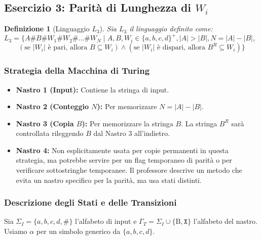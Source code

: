 \documentclass[a4paper, 11pt]{book} %
\newtheorem{definition}[theorem]{Definizione}
\theoremstyle{definition}
\newcommand{\B}{\text{B}} %
\begin{document}
\subsection{Esercizio 3: Parità di Lunghezza di $W_i$}

\begin{definition}[Linguaggio $L_3$]
Sia $L_3$ il linguaggio definito come:
$L_3 = \{A\texttt{\#}B\texttt{\#}W_1 \texttt{\#} W_2 \texttt{\#} \dots \texttt{\#} W_N \mid A, B, W_i \in \{a,b,c,d\}^+, |A| > |B|, N = |A| - |B|, $
$\qquad (\text{se } |W_i| \text{ è pari, allora } B \subseteq W_i) \land (\text{se } |W_i| \text{ è dispari, allora } B^R \subseteq W_i) \}$
\end{definition}

\subsubsection{Strategia della Macchina di Turing}
\begin{itemize}
    \item \textbf{Nastro 1 (Input):} Contiene la stringa di input.
    \item \textbf{Nastro 2 (Conteggio $N$):} Per memorizzare $N = |A| - |B|$.
    \item \textbf{Nastro 3 (Copia $B$):} Per memorizzare la stringa $B$. La stringa $B^R$ sarà controllata rileggendo $B$ dal Nastro 3 all'indietro.
    \item \textbf{Nastro 4:} Non esplicitamente usata per copie permanenti in questa strategia, ma potrebbe servire per un flag temporaneo di parità o per verificare sottostringhe temporanee. Il professore descrive un metodo che evita un nastro specifico per la parità, ma usa stati distinti.
\end{itemize}

\subsubsection{Descrizione degli Stati e delle Transizioni}
Sia $\Sigma_I = \{a,b,c,d,\texttt{\#}\}$ l'alfabeto di input e $\Gamma_T = \Sigma_I \cup \{\B, \texttt{X}\}$ l'alfabeto del nastro. Usiamo $\alpha$ per un simbolo generico da $\{a,b,c,d\}$.
\end{document}
